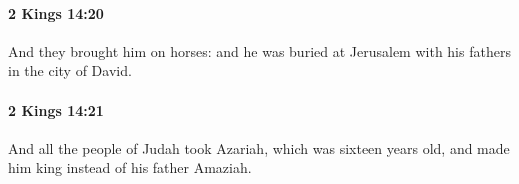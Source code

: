 		\paragraph{2 Kings 14:20} %
			\label{2KINGS-14-20}

			And they brought him on horses: and he was buried at Jerusalem with his fathers in the city of David.


		\paragraph{2 Kings 14:21} %
			\label{2KINGS-14-21}

			And all the people of Judah took Azariah, which was sixteen years old, and made him king instead of his father Amaziah.


